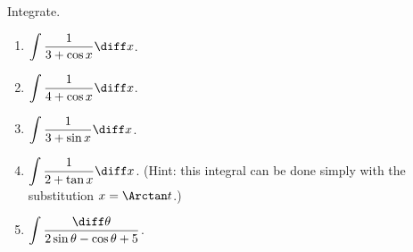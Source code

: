Integrate.
\begin{enumerate}[ref={\fcProblemRef}]
\item \label{problemInt1/(3+cos x)dx} $\displaystyle \int \frac{1}{3+\cos x}\diff x$.

\item $\displaystyle \int \frac{1}{4+\cos x}\diff x$.

\item $\displaystyle \int \frac{1}{3+\sin x}\diff x$.

\item \label{problemInt1/(2+tan x)dx}$\displaystyle \int \frac{1}{2+\tan x}\diff x$.  (Hint: this integral can be done simply with the substitution $x=\Arctan t$.)

\item $\displaystyle \int \frac{ \diff \theta }{ 2\sin \theta - \cos \theta +5}$.


\end{enumerate}